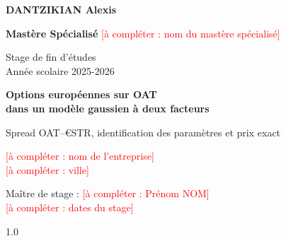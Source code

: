 \documentclass[12pt,a4paper]{article}
\newcommand{\acompleter}[1]{\textcolor{red}{[à compléter : #1]}}
\begin{document}
\begin{titlepage}
\singlespacing
\noindent
\begin{minipage}[t]{0.48\textwidth}
\textbf{DANTZIKIAN Alexis}
\end{minipage}\hfill
\begin{minipage}[t]{0.48\textwidth}\raggedleft
\textbf{Mastère Spécialisé} \acompleter{nom du mastère spécialisé}
\end{minipage}

\vspace{0.6cm}
\noindent Stage de fin d'études\\
Année scolaire 2025-2026

\vfill
\begin{center}
{\LARGE\bfseries Options européennes sur OAT\\[0.3em] dans un modèle gaussien à deux facteurs\par}
\vspace{0.8cm}
{\large Spread OAT–€STR, identification des paramètres et prix exact\par}
\end{center}
\vfill

\noindent
\begin{minipage}[t]{0.48\textwidth}
\acompleter{nom de l'entreprise}\\
\acompleter{ville}
\end{minipage}\hfill
\begin{minipage}[t]{0.48\textwidth}\raggedleft
Maître de stage : \acompleter{Prénom NOM}\\
\acompleter{dates du stage}
\end{minipage}
\end{titlepage}

\renewcommand{\contentsname}{Sommaire}
\setcounter{tocdepth}{2}
\begin{spacing}{1.0}
\tableofcontents
\end{spacing}
\newpage











\newpage


\newpage
\appendix


\newpage

\newpage

\end{document}
